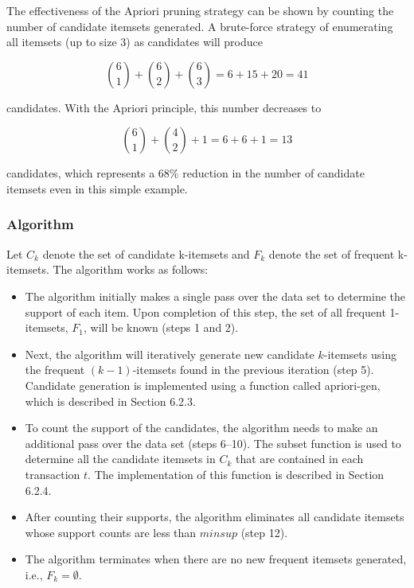\documentclass[conference]{IEEEtran}
\begin{document}
The effectiveness of the Apriori pruning strategy can be shown by counting the number of candidate itemsets generated. A brute-force strategy of enumerating all itemsets (up to size 3) as candidates will produce 

\[
\binom{6}{1} + \binom{6}{2} + \binom{6}{3} = 6 + 15 + 20 = 41
\]

candidates. With the Apriori principle, this number decreases to

\[
\binom{6}{1} + \binom{4}{2} + 1 = 6 + 6 + 1 = 13
\] 

candidates, which represents a 68\% reduction in the number of candidate itemsets even in this simple example. \\

\subsubsection{Algorithm}
Let \( C_k \) denote the set of candidate k-itemsets and \( F_k \) denote the set of frequent k-itemsets. The algorithm works as follows:

\begin{itemize}
    \item The algorithm initially makes a single pass over the data set to determine the support of each item. Upon completion of this step, the set of all frequent 1-itemsets, \( F_1 \), will be known (steps 1 and 2).
    
    \item Next, the algorithm will iteratively generate new candidate \( k \)-itemsets using the frequent \( (k-1) \)-itemsets found in the previous iteration (step 5). Candidate generation is implemented using a function called apriori-gen, which is described in Section 6.2.3.
    
    \item To count the support of the candidates, the algorithm needs to make an additional pass over the data set (steps 6–10). The subset function is used to determine all the candidate itemsets in \( C_k \) that are contained in each transaction \( t \). The implementation of this function is described in Section 6.2.4.
    
    \item After counting their supports, the algorithm eliminates all candidate itemsets whose support counts are less than \( minsup \) (step 12).
    
    \item The algorithm terminates when there are no new frequent itemsets generated, i.e., \( F_k = \emptyset \). \\
\end{itemize}
\end{document}
